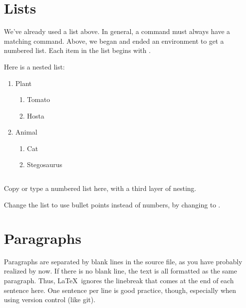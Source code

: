 \documentclass{article}
\begin{document}
\section{Lists}
\label{sec:lists}

We've already used a list above.
In general, a \latexcode{\\begin} command must always have a matching \latexcode{\\end} command.
Above, we began and ended an  environment to get a numbered list.
Each item in the list begins with \latexcode{\\item}.

Here is a nested list:
\begin{enumerate}
    \item Plant
    \begin{enumerate}
        \item Tomato
        \item Hosta
    \end{enumerate}
    \item Animal
    \begin{enumerate}
        \item Cat
        \item Stegosaurus
    \end{enumerate}
\end{enumerate}

\subsection*{\task}

Copy or type a numbered list here, with a third layer of nesting.

Change the list to use bullet points instead of numbers, by changing  to .

\section{Paragraphs}
\label{sec:paragraphs}

Paragraphs are separated by blank lines in the source file, as you have probably realized by now.
If there is no blank line, the text is all formatted as the same paragraph.
Thus, \LaTeX\ ignores the linebreak that comes at the end of each sentence here.
One sentence per line is good practice, though, especially when using version control (like git).
\end{document}
